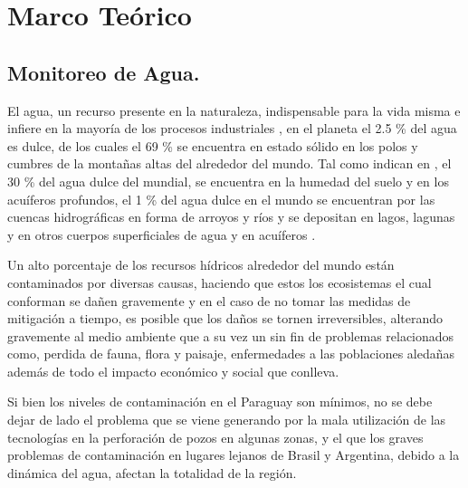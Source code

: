 
\chapter[Marco Te\'orico.]{Marco Te\'orico}


\section{Monitoreo de Agua.}
El agua, un recurso presente en la naturaleza, indispensable para la vida misma e infiere en la mayoría de los procesos industriales \cite{estudio_agua}, en el planeta el 2.5 \% del agua es dulce, de los cuales el 69 \% se encuentra en estado sólido en los polos y cumbres de la monta\~nas altas del alrededor del mundo. Tal como indican en \cite{junta-municipal-de-agua-potable-y-alcantarillado-de-mazatlan-no-date}, el 30 \% del agua dulce del mundial, se encuentra en la humedad del suelo y en los acuíferos profundos, el 1 \% del agua dulce en el mundo se encuentran por las cuencas hidrográficas en forma de arroyos y ríos y se depositan en lagos, lagunas y en otros cuerpos superficiales de agua y en acuíferos  \cite{junta-municipal-de-agua-potable-y-alcantarillado-de-mazatlan-no-date}.

Un alto porcentaje de los recursos h\'idricos alrededor del mundo están contaminados por diversas causas, haciendo que estos los ecosistemas el cual conforman se dañen gravemente y en el caso de no tomar las medidas de mitigación a tiempo, es posible que los da\~nos se tornen irreversibles, alterando gravemente al medio ambiente que a su vez un sin fin de problemas relacionados como, perdida de fauna, flora y paisaje, enfermedades a las poblaciones aledañas además de todo el impacto económico y social que conlleva.

Si bien los niveles de contaminación en el Paraguay son mínimos, no se debe dejar de lado el problema que se viene generando por la mala utilización de las tecnologías en la perforación de pozos en algunas zonas, y el que los graves problemas de contaminación en lugares lejanos de Brasil y Argentina, debido a la dinámica del agua, afectan la totalidad de la región.
\cite{salas-duenas-2015}

